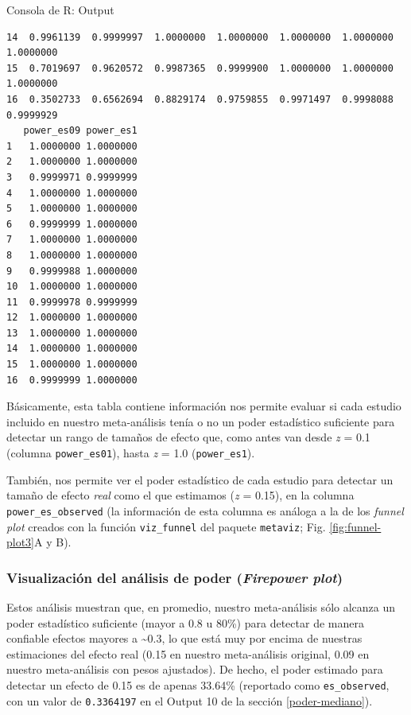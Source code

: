 \documentclass[
  bookmarksnumbered]{article}
\begin{document}
\begin{ROut}{Consola de R: Output~\thetcbcounter}
\begin{footnotesize}
\begin{verbatim}
14  0.9961139  0.9999997  1.0000000  1.0000000  1.0000000  1.0000000  1.0000000
15  0.7019697  0.9620572  0.9987365  0.9999900  1.0000000  1.0000000  1.0000000
16  0.3502733  0.6562694  0.8829174  0.9759855  0.9971497  0.9998088  0.9999929
   power_es09 power_es1
1   1.0000000 1.0000000
2   1.0000000 1.0000000
3   0.9999971 0.9999999
4   1.0000000 1.0000000
5   1.0000000 1.0000000
6   0.9999999 1.0000000
7   1.0000000 1.0000000
8   1.0000000 1.0000000
9   0.9999988 1.0000000
10  1.0000000 1.0000000
11  0.9999978 0.9999999
12  1.0000000 1.0000000
13  1.0000000 1.0000000
14  1.0000000 1.0000000
15  1.0000000 1.0000000
16  0.9999999 1.0000000
 \end{verbatim}
                \end{footnotesize}
                \end{ROut}

Básicamente, esta tabla contiene información nos permite evaluar si cada estudio incluido en nuestro meta-análisis tenía o no un poder estadístico suficiente para detectar un rango de tamaños de efecto que, como antes van desde \emph{z} = 0.1 (columna \texttt{power\_es01}), hasta \emph{z} = 1.0 (\texttt{power\_es1}).

También, nos permite ver el poder estadístico de cada estudio para detectar un tamaño de efecto \emph{real} como el que estimamos (\emph{z} = 0.15), en la columna \texttt{power\_es\_observed} (la información de esta columna es análoga a la de los \emph{funnel plot} creados con la función \texttt{viz\_funnel} del paquete \texttt{metaviz}; Fig. \ref{fig:funnel-plot3}A y B).

\hypertarget{firepower-plot}{%
\subsubsection{\texorpdfstring{Visualización del análisis de poder (\emph{Firepower plot})}{Visualización del análisis de poder (Firepower plot)}}\label{firepower-plot}}

Estos análisis muestran que, en promedio, nuestro meta-análisis sólo alcanza un poder estadístico suficiente (mayor a 0.8 u 80\%) para detectar de manera confiable efectos mayores a \textasciitilde0.3, lo que está muy por encima de nuestras estimaciones del efecto real (0.15 en nuestro meta-análisis original, 0.09 en nuestro meta-análisis con pesos ajustados). De hecho, el poder estimado para detectar un efecto de 0.15 es de apenas 33.64\% (reportado como \texttt{es\_observed}, con un valor de \texttt{0.3364197} en el Output 10 de la sección \ref{poder-mediano}).
\end{document}
